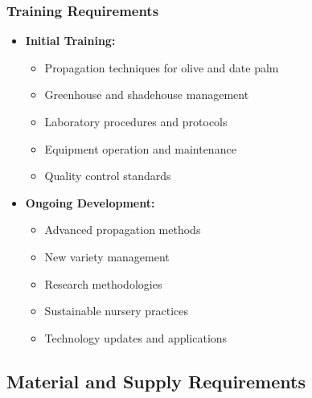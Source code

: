 \subsubsection{Training Requirements}
\begin{itemize}
    \item \textbf{Initial Training:}
    \begin{itemize}
        \item Propagation techniques for olive and date palm
        \item Greenhouse and shadehouse management
        \item Laboratory procedures and protocols
        \item Equipment operation and maintenance
        \item Quality control standards
    \end{itemize}
    
    \item \textbf{Ongoing Development:}
    \begin{itemize}
        \item Advanced propagation methods
        \item New variety management
        \item Research methodologies
        \item Sustainable nursery practices
        \item Technology updates and applications
    \end{itemize}
\end{itemize}

\subsection{Material and Supply Requirements}

